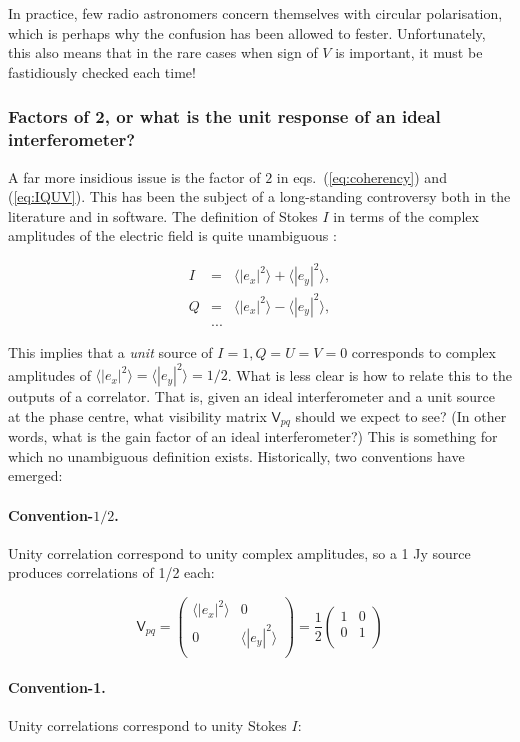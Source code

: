 \documentclass[]{aa}
\newcommand{\matrixtt}[4]{\left( \begin{array}{cc}#1&#2\\#3&#4\\\end{array} \right)}
\newcommand{\coh}[2]{\mathsf{{#1}}_{{#2}}}
\begin{document}
In practice, few radio astronomers concern themselves with circular polarisation, which is perhaps why the confusion has been allowed to fester. Unfortunately, this also means that in the rare cases when sign of $V$ is important, it
must be fastidiously checked each time!

\subsubsection{\label{sec:factor2}Factors of 2, or what is the unit response of an ideal interferometer?}

A far more insidious issue is the factor of $2$ in eqs.~(\ref{eq:coherency}) and (\ref{eq:IQUV}). This has been the subject of a long-standing controversy both in the literature and in software. The definition of Stokes $I$ in terms of the complex amplitudes of the electric field is quite unambiguous \citep{tms,born-wolf}:

\begin{eqnarray*}
I&=&\langle |e_x|^2\rangle  + \langle |e_y|^2\rangle , \\
Q&=&\langle |e_x|^2\rangle  - \langle |e_y|^2\rangle , \\
&...&
\end{eqnarray*}

This implies that a {\em unit} source of $I=1, Q=U=V=0$ corresponds to complex amplitudes of $\langle |e_x|^2\rangle =\langle |e_y|^2\rangle = 1/2$. What is less clear is how to relate this to the outputs of a correlator. That is, given an ideal interferometer and a unit source at the phase centre, what visibility matrix $\coh{V}{pq}$ should we expect to see? (In other words, what is the gain factor of an ideal interferometer?) This is something for which no unambiguous definition exists. Historically, two conventions have emerged:

\paragraph{Convention-$\scriptstyle 1/2$.} Unity correlation correspond to unity complex amplitudes, so a 1 Jy source produces correlations of 1/2 each: 

\[
\coh{V}{pq} = \matrixtt{\langle |e_x|^2\rangle }{0}{0}{\langle |e_y|^2\rangle } = \frac{1}{2}\matrixtt{1}{0}{0}{1}
\]

\paragraph{Convention-1.} Unity correlations correspond to unity Stokes $I$:
\end{document}
